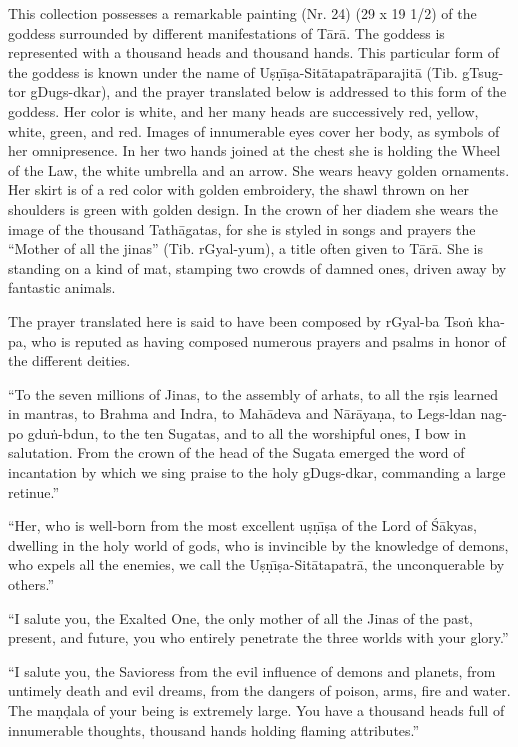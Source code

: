 \documentclass[a4paper, 12pt, oneside]{article}
\begin{document}
This collection possesses a remarkable painting (Nr. 24) (29 x 19 1/2) of the goddess surrounded by different manifestations of T\={a}r\={a}. The goddess is represented with a thousand heads and thousand hands. This particular form of the goddess is known under the name of U\d{s}\d{n}\={\i}\d{s}a-Sit\={a}tapatr\={a}parajit\={a} (Tib. gTsug-tor gDugs-dkar), and the prayer translated below is addressed to this form of the goddess. Her color is white, and her many heads are successively red, yellow, white, green, and red. Images of innumerable eyes cover her body, as symbols of her omnipresence. In her two hands joined at the chest she is holding the Wheel of the Law, the white umbrella and an arrow. She wears heavy golden ornaments. Her skirt is of a red color with golden embroidery, the shawl thrown on her shoulders is green with golden design. In the crown of her diadem she wears the image of the thousand Tath\={a}gatas, for she is styled in songs and prayers the ``Mother of all the jinas'' (Tib. rGyal-yum), a title often given to T\={a}r\={a}. She is standing on a kind of mat, stamping two crowds of damned ones, driven away by fantastic animals.

The prayer translated here is said to have been composed by rGyal-ba Tso\.{n} kha-pa, who is reputed as having composed numerous prayers and psalms in honor of the different deities.

``To the seven millions of Jinas, to the assembly of arhats, to all the r\d{s}is learned in mantras, to Brahma and Indra, to Mah\={a}deva and N\={a}r\={a}ya\d{n}a, to Legs-ldan nag-po gdu\.{n}-bdun, to the ten Sugatas, and to all the worshipful ones, I bow in salutation. From the crown of the head of the Sugata emerged the word of incantation by which we sing praise to the holy gDugs-dkar, commanding a large retinue.''

``Her, who is well-born from the most excellent u\d{s}\d{n}\={\i}\d{s}a of the Lord of \'{S}\={a}kyas, dwelling in the holy world of gods, who is invincible by the knowledge of demons, who expels all the enemies, we call the U\d{s}\d{n}\={\i}\d{s}a-Sit\={a}tapatr\={a}, the unconquerable by others.''

``I salute you, the Exalted One, the only mother of all the Jinas of the past, present, and future, you who entirely penetrate the three worlds with your glory.''

``I salute you, the Savioress from the evil influence of demons and planets, from untimely death and evil dreams, from the dangers of poison, arms, fire and water. The ma\d{n}\d{d}ala of your being is extremely large. You have a thousand heads full of innumerable thoughts, thousand hands holding flaming attributes.''
\end{document}

